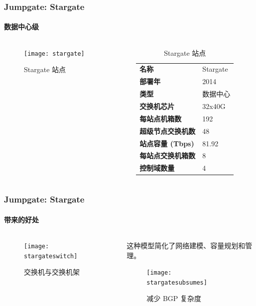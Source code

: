 \begin{frame}
    \frametitle{Jumpgate: Stargate}
    \framesubtitle{数据中心级}
    \begin{columns}
        \begin{column}{0.4\textwidth}
            \begin{figure}
                \texttt{[image: stargate]}
                \caption{Stargate 站点}
            \end{figure}
        \end{column}
        \begin{column}{0.6\textwidth}
            \begin{table}
                \begin{tabular}{>{\bfseries}ll}
                    \toprule
                    名称             & Stargate \\
                    部署年           & 2014     \\
                    类型             & 数据中心 \\
                    交换机芯片       & 32x40G   \\
                    每站点机箱数     & 192      \\
                    超级节点交换机数 & 48       \\
                    站点容量 (Tbps)  & 81.92    \\
                    每站点交换机箱数 & 8        \\
                    控制域数量       & 4        \\
                    \bottomrule
                \end{tabular}
                \caption{Stargate 站点}\label{tab:stargate}
            \end{table}
        \end{column}
    \end{columns}
\end{frame}

\begin{frame}
    \frametitle{Jumpgate: Stargate}
    \framesubtitle{带来的好处}

    \begin{columns}
        \begin{column}{0.2\textwidth}
            \begin{figure}
                \texttt{[image: stargateswitch]}
                \caption{交换机与交换机架}
            \end{figure}
        \end{column}
        \begin{column}{0.6\textwidth}
            这种模型简化了网络建模、容量规划和管理。
            \begin{figure}
                \texttt{[image: stargatesubsumes]}
                \caption{减少 BGP 复杂度}
            \end{figure}
        \end{column}
    \end{columns}
\end{frame}

